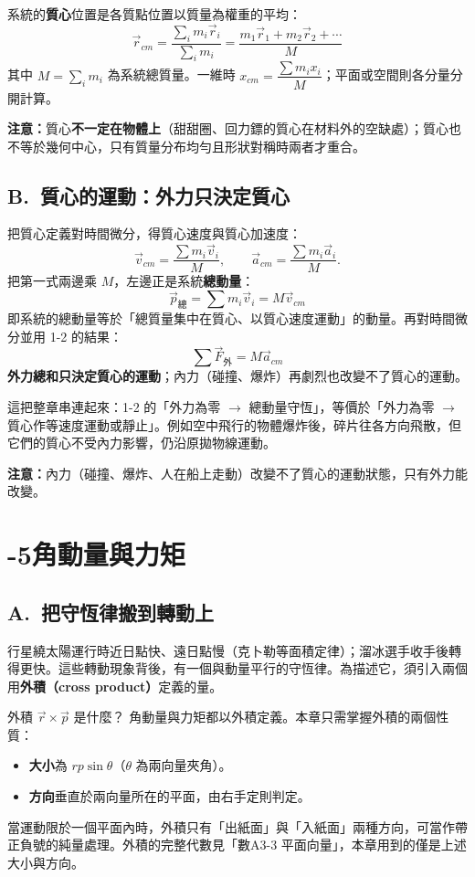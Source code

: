 \documentclass[11pt]{article}
\begin{document}
系統的\textbf{質心}位置是各質點位置以質量為權重的平均：
$$\boxed{\,\vec r_{cm}=\frac{\sum_i m_i\vec r_i}{\sum_i m_i}=\frac{m_1\vec r_1+m_2\vec r_2+\cdots}{M}\,}$$
其中 $M=\sum_i m_i$ 為系統總質量。一維時 $x_{cm}=\dfrac{\sum m_i x_i}{M}$；平面或空間則各分量分開計算。


\textbf{注意：}質心\textbf{不一定在物體上}（甜甜圈、回力鏢的質心在材料外的空缺處）；質心也不等於幾何中心，只有質量分布均勻且形狀對稱時兩者才重合。

\subsection*{\sffamily B.\ 質心的運動：外力只決定質心}

把質心定義對時間微分，得質心速度與質心加速度：
$$\vec v_{cm}=\frac{\sum m_i\vec v_i}{M},\qquad \vec a_{cm}=\frac{\sum m_i\vec a_i}{M}.$$
把第一式兩邊乘 $M$，左邊正是系統\textbf{總動量}：
$$\boxed{\,\vec p_{\text{總}}=\sum m_i\vec v_i=M\vec v_{cm}\,}$$
即系統的總動量等於「總質量集中在質心、以質心速度運動」的動量。再對時間微分並用 1-2 的結果：
$$\boxed{\,\sum\vec F_{\text{外}}=M\vec a_{cm}\,}$$
\textbf{外力總和只決定質心的運動}；內力（碰撞、爆炸）再劇烈也改變不了質心的運動。

這把整章串連起來：1-2 的「外力為零 $\rightarrow$ 總動量守恆」，等價於「外力為零 $\rightarrow$ 質心作等速度運動或靜止」。例如空中飛行的物體爆炸後，碎片往各方向飛散，但它們的質心不受內力影響，仍沿原拋物線運動。

\textbf{注意：}內力（碰撞、爆炸、人在船上走動）改變不了質心的運動狀態，只有外力能改變。

\section*{-5\quad 角動量與力矩}

\subsection*{\sffamily A.\ 把守恆律搬到轉動上}

行星繞太陽運行時近日點快、遠日點慢（克卜勒等面積定律）；溜冰選手收手後轉得更快。這些轉動現象背後，有一個與動量平行的守恆律。為描述它，須引入兩個用\textbf{外積（cross product）}定義的量。

\begin{補充框}{外積 $\vec r\times\vec p$ 是什麼？}
角動量與力矩都以外積定義。本章只需掌握外積的兩個性質：
\begin{itemize}\setlength{\itemsep}{1pt}
\item \textbf{大小}為 $rp\sin\theta$（$\theta$ 為兩向量夾角）。
\item \textbf{方向}垂直於兩向量所在的平面，由右手定則判定。
\end{itemize}
當運動限於一個平面內時，外積只有「出紙面」與「入紙面」兩種方向，可當作帶正負號的純量處理。外積的完整代數見「數A3-3 平面向量」，本章用到的僅是上述大小與方向。
\end{補充框}
\end{document}
